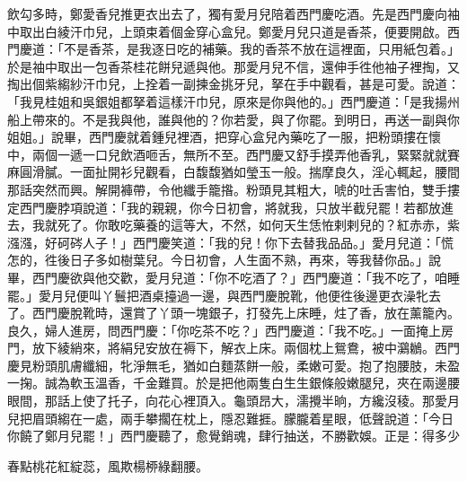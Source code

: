 飲勾多時，鄭愛香兒推更衣出去了，獨有愛月兒陪着西門慶吃酒。先是西門慶向袖中取出白綾汗巾兒，上頭束着個金穿心盒兒。鄭愛月兒只道是香茶，便要開啟。西門慶道：「不是香茶，是我逐日吃的補藥。{}我的香茶不放在這裡面，只用紙包着。」於是袖中取出一包香茶桂花餅兒遞與他。那愛月兒不信，還伸手徃他袖子裡掏，又掏出個紫縐紗汗巾兒，上拴着一副揀金挑牙兒，拏在手中觀看，甚是可愛。說道：「我見桂姐和吳銀姐都拏着這樣汗巾兒，原來是你與他的。」西門慶道：「是我揚州船上帶來的。不是我與他，誰與他的？你若愛，與了你罷。到明日，再送一副與你姐姐。」說畢，西門慶就着鍾兒裡酒，把穿心盒兒內藥吃了一服，把粉頭摟在懷中，兩個一遞一口兒飲酒咂舌，無所不至。西門慶又舒手摸弄他香乳，緊緊就就賽麻圓滑膩。一面扯開衫兒觀看，白馥馥猶如瑩玉一般。揣摩良久，淫心輒起，腰間那話突然而興。解開褲帶，令他纖手籠揝。粉頭見其粗大，唬的吐舌害怕，雙手摟定西門慶脖項說道：「我的親親，你今日初會，將就我，只放半截兒罷！若都放進去，我就死了。你敢吃藥養的這等大，不然，如何天生恁恠剌剌兒的？紅赤赤，紫漒漒，好砢硶人子！」西門慶笑道：「我的兒！你下去替我品品。」愛月兒道：「慌怎的，徃後日子多如樹葉兒。今日初會，人生面不熟，再來，等我替你品。」說畢，西門慶欲與他交歡，愛月兒道：「你不吃酒了？」西門慶道：「我不吃了，咱睡罷。」愛月兒便叫丫鬟把酒桌擡過一邊，與西門慶脫靴，他便徃後邊更衣澡牝去了。西門慶脫靴時，還賞了丫頭一塊銀子，打發先上床睡，炷了香，放在薰籠內。良久，婦人進房，問西門慶：「你吃茶不吃？」西門慶道：「我不吃。」{}一面掩上房門，放下綾綃來，將絹兒安放在褥下，解衣上床。兩個枕上鴛鴦，被中鸂鶒。西門慶見粉頭肌膚纖細，牝淨無毛，猶如白麵蒸餅一般，柔嫩可愛。抱了抱腰肢，未盈一掬。誠為軟玉溫香，千金難買。於是把他兩隻白生生銀條般嫩腿兒，夾在兩邊腰眼間，那話上使了托子，向花心裡頂入。龜頭昂大，濡攪半晌，方纔沒稜。那愛月兒把眉頭縐在一處，兩手攀擱在枕上，隱忍難捱。朦朧着星眼，低聲說道：「今日你饒了鄭月兒罷！」西門慶聽了，愈覺銷魂，肆行抽送，不勝歡娛。正是：得多少

春點桃花紅綻蕊，風欺楊桺綠翻腰。

